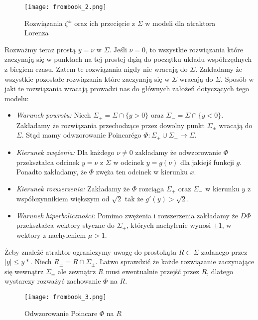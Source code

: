 \documentclass[12pt]{report}
\begin{document}
	\begin{figure}[H]
		\centering
		\texttt{[image: frombook\_2.png]}
		\caption{Rozwiązania $\zeta^{\pm}$ oraz ich przecięcie z $\Sigma$ w modeli dla atraktora Lorenza \cite{HSD}}
		\label{fig:frombook_2}
	\end{figure}
	\par Rozważmy teraz prostą $y = \nu$ w $\Sigma$. Jeśli $\nu = 0$, to wszystkie rozwiązania które zaczynają się w punktach na tej prostej dążą do początku układu współrzędnych z biegiem czasu. Zatem te rozwiązania nigdy nie wracają do $\Sigma$. Zakładamy że wszystkie pozostałe rozwiązania które zaczynają się w $\Sigma$ wracają do $\Sigma$. Sposób w jaki te rozwiązania wracają prowadzi nas do głównych założeń dotyczących tego modelu:
	\begin{itemize}
		\item \textit{Warunek powrotu:} Niech $\Sigma_+ = \Sigma \cap \{y > 0\}$ oraz $\Sigma_- = \Sigma \cap \{y < 0\}$. Zakładamy że rozwiązania przechodzące przez dowolny punkt $\Sigma_{\pm}$ wracają do $\Sigma$. Stąd mamy odwzorowanie Poincarégo $\Phi: \Sigma_+ \cup \Sigma_- \to \Sigma$.
		\item \textit{Kierunek zwężenia:} Dla każdego $\nu \ne 0$ zakładamy że odwzorowanie $\Phi$ przekształca odcinek $y = \nu$ z $\Sigma$ w odcinek $y = g(\nu)$ dla jakiejś funkcji $g$. Ponadto zakładamy, że $\Phi$ zwęża ten odcinek w kierunku $x$.
		\item \textit{Kierunek rozszerzenia:} Zakładamy że $\Phi$ rozciąga $\Sigma_+$ oraz $\Sigma_-$ w kierunku $y$ z współczynnikiem większym od $\sqrt{2}$ tak że $g'(y) > \sqrt{2}$.
		\item \textit{Warunek hiperboliczności:} Pomimo zwężenia i rozszerzenia zakładamy że $D\Phi$ przekształca wektory styczne do $\Sigma_{\pm}$, których nachylenie wynosi $\pm 1$, w wektory z nachyleniem $\mu > 1$.
	\end{itemize}
	\par Żeby znaleźć atraktor ograniczymy uwagę do prostokąta $R \subset \Sigma$ zadanego przez $\lvert y \rvert \le y*$. Niech $R_{\pm} = R \cap \Sigma_{\pm}$. Łatwo sprawdzić że każde rozwiązanie zaczynające się wewnątrz $\Sigma_{\pm}$ ale zewnątrz $R$ musi ewentualnie przejść przez $R$, dlatego wystarczy rozważyć zachowanie $\Phi$ na $R$.
	\begin{figure}[H]
		\centering
		\texttt{[image: frombook\_3.png]}
		\caption{Odwzorowanie Poincare $\Phi$ na $R$ \cite{HSD}}
		\label{fig:frombook_3}
	\end{figure}
\end{document}
